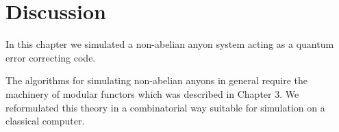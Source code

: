 %
%
%
%
%
%
%


\section{Discussion}

In this chapter we simulated a non-abelian anyon system acting as
a quantum error correcting code.

The algorithms for simulating non-abelian anyons in general require
the machinery of modular functors which was described in Chapter 3.
We reformulated this theory in a combinatorial way suitable for
simulation on a classical computer.

